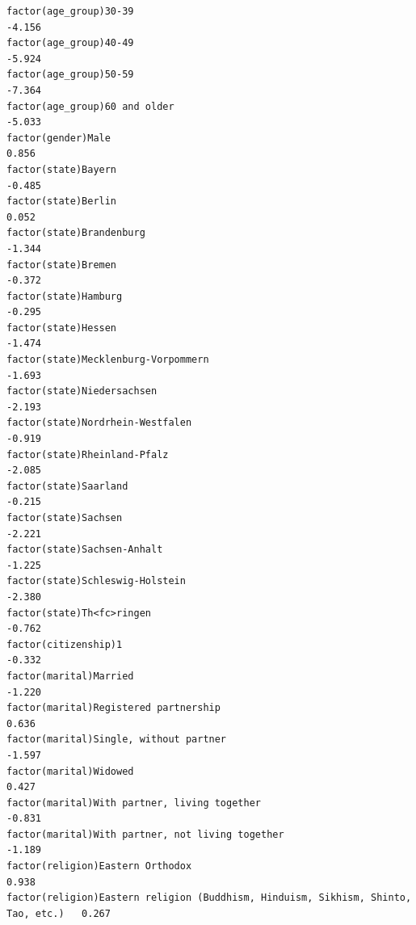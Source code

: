 \documentclass[
]{article}
\begin{document}
\begin{table}
\begin{minipage}[t]{\linewidth}
{\begin{verbatim}
factor(age_group)30-39                                                             -4.156
factor(age_group)40-49                                                             -5.924
factor(age_group)50-59                                                             -7.364
factor(age_group)60 and older                                                      -5.033
factor(gender)Male                                                                  0.856
factor(state)Bayern                                                                -0.485
factor(state)Berlin                                                                 0.052
factor(state)Brandenburg                                                           -1.344
factor(state)Bremen                                                                -0.372
factor(state)Hamburg                                                               -0.295
factor(state)Hessen                                                                -1.474
factor(state)Mecklenburg-Vorpommern                                                -1.693
factor(state)Niedersachsen                                                         -2.193
factor(state)Nordrhein-Westfalen                                                   -0.919
factor(state)Rheinland-Pfalz                                                       -2.085
factor(state)Saarland                                                              -0.215
factor(state)Sachsen                                                               -2.221
factor(state)Sachsen-Anhalt                                                        -1.225
factor(state)Schleswig-Holstein                                                    -2.380
factor(state)Th<fc>ringen                                                          -0.762
factor(citizenship)1                                                               -0.332
factor(marital)Married                                                             -1.220
factor(marital)Registered partnership                                               0.636
factor(marital)Single, without partner                                             -1.597
factor(marital)Widowed                                                              0.427
factor(marital)With partner, living together                                       -0.831
factor(marital)With partner, not living together                                   -1.189
factor(religion)Eastern Orthodox                                                    0.938
factor(religion)Eastern religion (Buddhism, Hinduism, Sikhism, Shinto, Tao, etc.)   0.267

\end{verbatim}}
\end{minipage}
\end{table}
\end{document}

